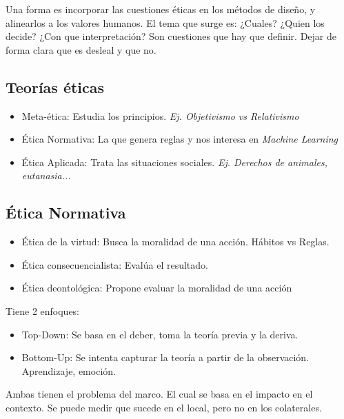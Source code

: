 \documentclass[titlepage,a4paper]{article}
\begin{document}
Una forma es incorporar las cuestiones éticas en los métodos de diseño, y alinearlos a los valores humanos. El tema que surge es: ¿Cuales? ¿Quien los decide?  ¿Con que interpretación? Son cuestiones que hay que definir. Dejar de forma clara que es desleal y que no.

\subsection{Teorías éticas}
\begin{itemize}
    \item Meta-ética: Estudia los principios. \textit{Ej. Objetivismo vs Relativismo}
    
    \item Ética Normativa: La que genera reglas y nos interesa en \textit{Machine Learning}
    
    \item Ética Aplicada: Trata las situaciones sociales. \textit{Ej. Derechos de animales, eutanasia...}
\end{itemize}

\subsection{Ética Normativa}
\begin{itemize}
    \item Ética de la virtud: Busca la moralidad de una acción. Hábitos vs Reglas.
    \item Ética consecuencialista: Evalúa el resultado.
    \item Ética deontológica: Propone evaluar la moralidad de una acción
\end{itemize}


Tiene 2 enfoques:
\begin{itemize}
    \item Top-Down: Se basa en el deber, toma la teoría previa y la deriva.
    \item Bottom-Up: Se intenta capturar la teoría a partir de la observación. Aprendizaje, emoción.
\end{itemize}

Ambas tienen el problema del marco. El cual se basa en el impacto en el contexto. Se puede medir que sucede en el local, pero no en los colaterales.
\end{document}
